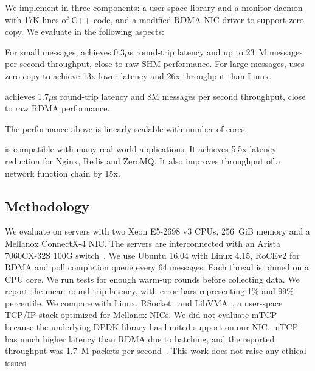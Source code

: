 
We implement \sys in three components: a user-space library \libipc{} and a monitor daemon with 17K lines of C++ code, and a modified RDMA NIC driver to support zero copy. We evaluate \sys in the following aspects:

For small messages, \sys achieves 0.3$\mu$s round-trip latency and up to 23~M messages per second throughput, close to raw SHM performance. For large messages, \sys uses zero copy to achieve 13x lower latency and 26x throughput than Linux.

\sys achieves  1.7$\mu$s round-trip latency and 8M messages per second throughput, close to raw RDMA performance.


The performance above is linearly scalable with number of cores. %


\sys{} is compatible with many real-world applications.
It achieves 5.5x latency reduction for Nginx, Redis and ZeroMQ.
It also improves throughput of a network function chain by 15x.


\subsection{Methodology}
\label{subsec:methodology}

We evaluate \sys on servers with two Xeon E5-2698 v3 CPUs, 256~GiB memory and a Mellanox ConnectX-4 NIC. The servers are interconnected with an Arista 7060CX-32S 100G switch~\cite{arista-7060cx}. We use Ubuntu 16.04 with Linux 4.15, RoCEv2 for RDMA and poll completion queue every 64 messages.
Each thread is pinned on a CPU core. We run tests for enough warm-up rounds before collecting data.
We report the mean round-trip latency, with error bars representing 1\% and 99\% percentile.
We compare with Linux, RSocket~\cite{rsockets} and LibVMA~\cite{libvma}, a user-space TCP/IP stack optimized for Mellanox NICs.
We did not evaluate mTCP~\cite{jeong2014mtcp} because the underlying DPDK library has limited support on our NIC. mTCP has much higher latency than RDMA due to batching, and the reported throughput was 1.7~M packets per second~\cite{kalia2018datacenter}. %
This work does not raise any ethical issues.

